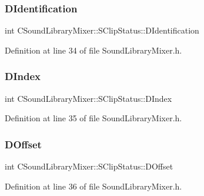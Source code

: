\subsubsection{\texorpdfstring{D\+Identification}{DIdentification}}
{\footnotesize\ttfamily int C\+Sound\+Library\+Mixer\+::\+S\+Clip\+Status\+::\+D\+Identification}



Definition at line 34 of file Sound\+Library\+Mixer.\+h.

\hypertarget{structCSoundLibraryMixer_1_1SClipStatus_a816de7bb8f6d975ec56008d56826050d}{}\label{structCSoundLibraryMixer_1_1SClipStatus_a816de7bb8f6d975ec56008d56826050d} 
\subsubsection{\texorpdfstring{D\+Index}{DIndex}}
{\footnotesize\ttfamily int C\+Sound\+Library\+Mixer\+::\+S\+Clip\+Status\+::\+D\+Index}



Definition at line 35 of file Sound\+Library\+Mixer.\+h.

\hypertarget{structCSoundLibraryMixer_1_1SClipStatus_af1fd7d320df05e7ac19306352c02ffb6}{}\label{structCSoundLibraryMixer_1_1SClipStatus_af1fd7d320df05e7ac19306352c02ffb6} 
\subsubsection{\texorpdfstring{D\+Offset}{DOffset}}
{\footnotesize\ttfamily int C\+Sound\+Library\+Mixer\+::\+S\+Clip\+Status\+::\+D\+Offset}



Definition at line 36 of file Sound\+Library\+Mixer.\+h.

\hypertarget{structCSoundLibraryMixer_1_1SClipStatus_a260c67e2b8881a674e4ebbffbdba6194}{}\label{structCSoundLibraryMixer_1_1SClipStatus_a260c67e2b8881a674e4ebbffbdba6194} 
